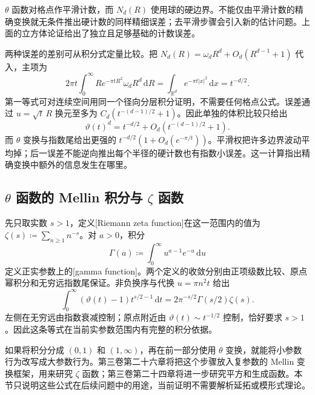 \(\theta\) 函数对格点作平滑计数，而 \(N_d(R)\) 使用球的硬边界。不能仅由平滑计数的精确变换就无条件推出硬计数的同样精细误差；去平滑步骤会引入新的估计问题。上面的立方体论证给出了独立且足够基础的计数误差。

\ProseParagraphBreak

两种误差的差别可从积分式定量比较。把 \(N_d(R)=\omega_dR^d+O_d(R^{d-1}+1)\) 代入，主项为
\[
 2\pi t\int_0^\infty R e^{-\pi tR^2}\omega_dR^d\,\mathrm{d}R
 =\int_{\mathbb R^d}e^{-\pi t|x|^2}\,\mathrm{d}x=t^{-d/2}.
\]
第一等式可对连续空间用同一个径向分层积分证明，不需要任何格点公式。误差通过 \(u=\sqrt t\,R\) 换元至多为 \(C_d(t^{-(d-1)/2}+1)\)。因此单独的体积比较只给出
\[
 \vartheta(t)^d=t^{-d/2}+O_d(t^{-(d-1)/2}+1).
\]
而 \(\theta\) 变换与指数尾给出更强的 \(t^{-d/2}(1+O_d(e^{-\pi/t}))\)。平滑权把许多边界波动平均掉；后一误差不能逆向推出每个半径的硬计数也有指数小误差。这一计算指出精确变换中额外的信息发生在哪里。

\subsection{\texorpdfstring{\(\theta\)}{\AnalysisPdfTheta} 函数的 Mellin 积分与 \texorpdfstring{\(\zeta\)}{\AnalysisPdfZeta} 函数}
\label{b2:subsec:060303}

先只取实数 \(s>1\)，定义[Riemann zeta function]在这一范围内的值为 \(\zeta(s)\coloneqq\sum_{n\geq1}n^{-s}\)。对 \(a>0\)，积分
\[
 \Gamma(a)\coloneqq\int_0^\infty u^{a-1}e^{-u}\,\mathrm{d}u
\]
定义正实参数上的[gamma function]。两个定义的收敛分别由正项级数比较、原点幂积分和无穷远指数尾保证。非负换序与代换 \(u=\pi n^2t\) 给出
\[
 \int_0^\infty(\vartheta(t)-1)t^{s/2-1}\,\mathrm{d}t
 =2\pi^{-s/2}\Gamma(s/2)\zeta(s).
\]
左侧在无穷远由指数衰减控制；原点附近由 \(\vartheta(t)\sim t^{-1/2}\) 控制，恰好要求 \(s>1\)。因此这条等式在当前实参数范围内有完整的积分依据。

\ProseParagraphBreak

如果将积分分成 \((0,1)\) 和 \((1,\infty)\)，再在前一部分使用 \(\theta\) 变换，就能将小参数行为改写成大参数行为。第三卷第二十六章将把这个步骤放入复参数的 Mellin 变换框架，用来研究 \(\zeta\) 函数；第三卷第二十四章将进一步研究平方和生成函数。本节只说明这些公式在后续问题中的用途，当前证明不需要解析延拓或模形式理论。

\ProseParagraphBreak

